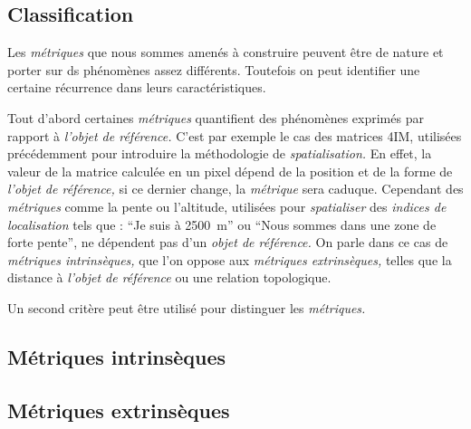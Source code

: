 

\subsection{Classification}

Les \emph{métriques} que nous sommes amenés à construire peuvent être
de nature et porter sur ds phénomènes assez différents. Toutefois on
peut identifier une certaine récurrence dans leurs
caractéristiques.

Tout d'abord certaines \emph{métriques} quantifient des phénomènes
exprimés par rapport à \emph{l'objet de référence.}  C'est par exemple
le cas des matrices 4IM, utilisées précédemment pour introduire la
méthodologie de \emph{spatialisation.} En effet, la valeur de la
matrice calculée en un pixel dépend de la position et de la forme de
\emph{l'objet de référence,} si ce dernier change, la \emph{métrique}
sera caduque. Cependant des \emph{métriques} comme la pente ou
l'altitude, utilisées pour \emph{spatialiser} des \emph{indices de
  localisation} tels que : \enquote{Je suis à \SI{2500}{\meter}} ou
\enquote{Nous sommes dans une zone de forte pente}, ne dépendent pas
d'un \emph{objet de référence.} On parle dans ce cas de
\emph{métriques intrinsèques,} que l'on oppose aux \emph{métriques
  extrinsèques,} telles que la distance à \emph{l'objet de référence}
ou une relation topologique.

Un second critère peut être utilisé pour distinguer les
\emph{métriques.}


\subsection{Métriques intrinsèques}



\subsection{Métriques extrinsèques}


